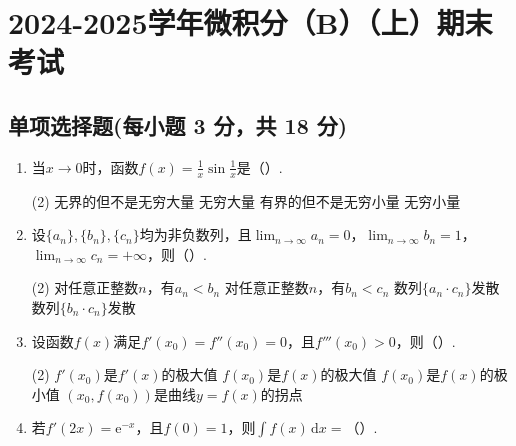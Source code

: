 \documentclass[../Main.tex]{subfiles}
\begin{document}
\chapter{2024-2025学年微积分（B）（上）期末考试}

\section{单项选择题(每小题 3 分，共 18 分)}
\begin{enumerate}
    \item 当$x\to0$时，函数$f(x)=\frac{1}{x}\sin\frac{1}{x}$是（\qquad）.

          \begin{tasks}[label=\textbf{\Alph*.}, label-width=1.5em, column-sep=1em](2)
              \task 无界的但不是无穷大量
              \task 无穷大量
              \task 有界的但不是无穷小量
              \task 无穷小量
          \end{tasks}
          \vspace{1em}

    \item 设$\{a_{n}\},\{b_{n}\},\{c_{n}\}$均为非负数列，且$\lim_{n\to\infty}a_{n}
              =0$，$\lim_{n\to\infty}b_{n}=1$，$\lim_{n\to\infty}c_{n}=+\infty$，则（\qquad）.

          \begin{tasks}[label=\textbf{\Alph*.}, label-width=1.5em, column-sep=1em](2)
              \task 对任意正整数$n$，有$a_{n}<b_{n}$
              \task 对任意正整数$n$，有$b_{n}<c_{n}$
              \task 数列$\{a_{n}\cdot c_{n}\}$发散
              \task 数列$\{b_{n}\cdot c_{n}\}$发散
          \end{tasks}
          \vspace{1em}

    \item 设函数$f(x)$满足$f'(x_{0})=f''(x_{0})=0$，且$f'''(x_{0})>0$，则（\qquad）.

          \begin{tasks}[label=\textbf{\Alph*.}, label-width=1.5em, column-sep=1em](2)
              \task $f'(x_{0})$是$f'(x)$的极大值
              \task $f(x_{0})$是$f(x)$的极大值
              \task $f(x_{0})$是$f(x)$的极小值
              \task $(x_{0},f(x_{0}))$是曲线$y=f(x)$的拐点
          \end{tasks}
          \vspace{1em}

    \item 若$f'(2x)=\mathrm{e}^{-x}$，且$f(0)=1$，则$\int f(x)\,\mathrm{d}x=$（\qquad）.


\end{enumerate}
\end{document}

